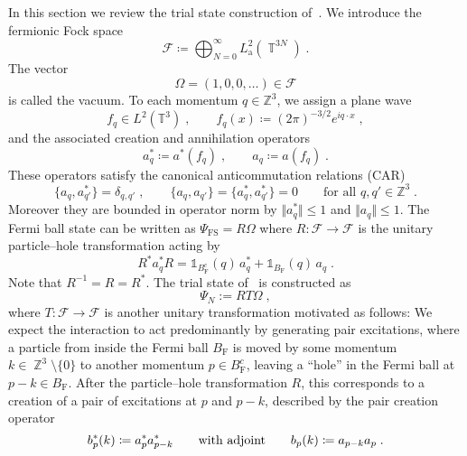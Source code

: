 \documentclass[12pt,a4paper]{article}
\numberwithin{equation}{section}
\newcommand{\cF}{\mathcal{F}}
\newcommand{\TTT}{\mathbb{T}}
\newcommand{\ZZZ}{\mathbb{Z}}
\newcommand{\1}{\mathbb{I}}
\newcommand{\F}{\mathrm{F}}
\newcommand{\FS}{\mathrm{FS}}
\DeclareMathOperator{\Z}{\mathbb{Z}}
\DeclareMathOperator{\T}{\mathbb{T}}
\theoremstyle{plain}
\theoremstyle{definition}
\theoremstyle{remark}
\theoremstyle{plain}
\theoremstyle{definition}
\theoremstyle{remark}
\begin{document}
In this section we review the trial state construction of~\cite{CHN23}. We introduce the fermionic Fock space
\begin{equation}
	\cF \coloneq \bigoplus_{N=0}^\infty L^2_{\mathrm{a}}(\T^{3N}) \;.
\end{equation}
The vector
\begin{equation}
\Omega = (1,0,0,\ldots) \in \cF
\end{equation}
is called the vacuum. To each momentum $ q \in \ZZZ^3 $, we assign a plane wave
\begin{equation}
	f_q \in L^2(\TTT^3) \;, \qquad
	f_q(x) \coloneq (2 \pi)^{-3/2} e^{i q \cdot x} \;,
\end{equation}
and the associated creation and annihilation operators
\begin{equation}
	a^*_q \coloneq a^*(f_q) \;, \qquad
	a_q \coloneq a(f_q) \;.
\end{equation}
These operators satisfy the canonical anticommutation relations (CAR)
\begin{equation} \label{eq:CAR}
	\{a_q, a_{q'}^*\} = \delta_{q, q'} \;, \qquad
	\{a_q, a_{q'}\} = \{a_q^*, a_{q'}^*\} = 0 \qquad \text{for all } q, q' \in \ZZZ^3\;.
\end{equation}
Moreover they are bounded in operator norm by $ \Vert a_q^* \Vert \leq 1$ and $\Vert a_q \Vert \le 1 $.
The Fermi ball state can be written as $ \Psi_{\FS} = R \Omega $ where $ R: \cF \to \cF $ is the unitary particle--hole transformation acting by
\begin{equation} \label{eq:R}
	R^* a_q^* R 	= \mathds{1}_{B_{\F}^c}(q) \, a_q^* 	+ \mathds{1}_{B_{\F}}(q) \, a_q \;.
\end{equation}
Note that $ R^{-1} = R = R^* $. The trial state of~\cite{CHN23} is constructed as
\begin{equation} \label{eq:Psitrial}
	\Psi_N := R T \Omega \;,
\end{equation}
where $ T: \cF \to \cF $ is another unitary transformation motivated as follows: We expect the interaction to act predominantly by generating pair excitations, where a particle from inside the Fermi ball $ B_{\F} $ is moved by some momentum $ k \in \Z^3 \setminus \{ 0 \} $ to another momentum $ p \in B_{\F}^c $, leaving a ``hole'' in the Fermi ball at $ p-k \in B_{\F} $. After the particle--hole transformation $ R $, this corresponds to a creation of a pair of excitations at $ p $ and $ p-k $, described by the pair creation operator
\begin{equation} \label{eq:b}
	b^*_p(k) \coloneq a_p^* a_{p-k}^* 
	\qquad \textnormal{with adjoint} \qquad
	b_p(k) \coloneq a_{p-k} a_p \;.
\end{equation}
\end{document}
